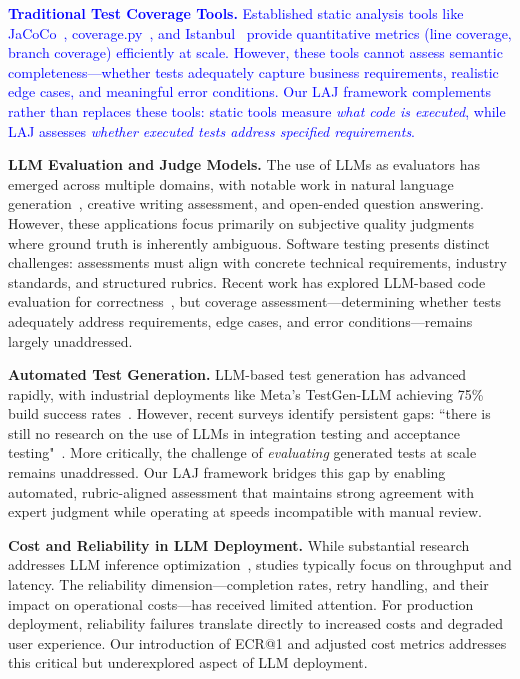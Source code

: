 \documentclass[letterpaper]{article} %
\newcommand{\add}[1]{\textcolor{blue}{#1}}
\newcommand{\add}[1]{#1}
\begin{document}
\add{\textbf{Traditional Test Coverage Tools.} Established static analysis tools like JaCoCo~\cite{crap4j2010}, coverage.py~\cite{coveragepy}, and Istanbul~\cite{istanbul} provide quantitative metrics (line coverage, branch coverage) efficiently at scale. However, these tools cannot assess semantic completeness---whether tests adequately capture business requirements, realistic edge cases, and meaningful error conditions. Our LAJ framework complements rather than replaces these tools: static tools measure \textit{what code is executed}, while LAJ assesses \textit{whether executed tests address specified requirements}.}%

\textbf{LLM Evaluation and Judge Models.} The use of LLMs as evaluators has emerged across multiple domains, with notable work in natural language generation~\cite{zheng2023judging}, creative writing assessment, and open-ended question answering. However, these applications focus primarily on subjective quality judgments where ground truth is inherently ambiguous. Software testing presents distinct challenges: assessments must align with concrete technical requirements, industry standards, and structured rubrics. Recent work has explored LLM-based code evaluation for correctness~\cite{chen2021evaluating}, but coverage assessment---determining whether tests adequately address requirements, edge cases, and error conditions---remains largely unaddressed.

\textbf{Automated Test Generation.} LLM-based test generation has advanced rapidly, with industrial deployments like Meta's TestGen-LLM achieving 75\% build success rates~\cite{alshahwan2024automated}. However, recent surveys identify persistent gaps: ``there is still no research on the use of LLMs in integration testing and acceptance testing"~\cite{wang2024effectiveness}. More critically, the challenge of \textit{evaluating} generated tests at scale remains unaddressed. Our LAJ framework bridges this gap by enabling automated, rubric-aligned assessment that maintains strong agreement with expert judgment while operating at speeds incompatible with manual review.

\textbf{Cost and Reliability in LLM Deployment.} While substantial research addresses LLM inference optimization~\cite{huang2025llms}, studies typically focus on throughput and latency. The reliability dimension---completion rates, retry handling, and their impact on operational costs---has received limited attention. For production deployment, reliability failures translate directly to increased costs and degraded user experience. Our introduction of ECR@1 and adjusted cost metrics addresses this critical but underexplored aspect of LLM deployment.
\end{document}
